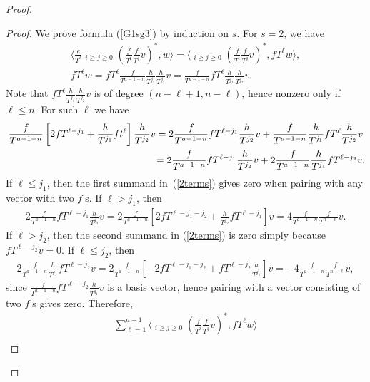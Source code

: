 \begin{proof}
\begin{proof}
We prove formula (\ref{G1sg3}) by induction on $s$. For $s=2$, we have
\begin{gather*}
\bigg\langle \frac{e}{T^{\ell}} \mathop{\sum_{i+j=a-1-\ell}}_{i\geq j\geq 0} \left(\frac{f}{T^i}\frac{f}{T^j}v\right)^*, w \bigg\rangle = \bigg\langle \mathop{\sum_{i+j=a-1-\ell}}_{i\geq j\geq 0} \left(\frac{f}{T^i}\frac{f}{T^j}v\right)^*, fT^{\ell} w \bigg\rangle, \\
 fT^{\ell} w = fT^{\ell} \frac{f}{T^{a-1-n}}\frac{h}{T^{j_1}} \frac{h}{T^{j_2}} v = \frac{f}{T^{a-1-n}} fT^{\ell} \frac{h}{T^{j_1}} \frac{h}{T^{j_2}} v.
\end{gather*}
Note that $fT^{\ell} \frac{h}{T^{j_1}} \frac{h}{T^{j_2}} v$ is of degree $(n-\ell+1, n-\ell)$, hence nonzero only if $\ell \leq n$. For such $\ell$ we have
\begin{gather}
\frac{f}{T^{a-1-n}} \left[ 2fT^{\ell-j_1} + \frac{h}{T^{j_1}} ft^{\ell} \right] \frac{h}{T^{j_2}} v = 2 \frac{f}{T^{a-1-n}} fT^{\ell-j_1} \frac{h}{T^{j_2}} v + \frac{f}{T^{a-1-n}} \frac{h}{T^{j_1}} fT^{\ell} \frac{h}{T^{j_2}} v \nonumber \\
\hphantom{\frac{f}{T^{a-1-n}} \left[ 2fT^{\ell-j_1} + \frac{h}{T^{j_1}} ft^{\ell} \right] \frac{h}{T^{j_2}} v} = 2 \frac{f}{T^{a-1-n}} fT^{\ell-j_1} \frac{h}{T^{j_2}} v +2 \frac{f}{T^{a-1-n}} \frac{h}{T^{j_1}} fT^{\ell-j_2} v. \label{2terms}
\end{gather}
If $\ell \leq j_1$, then the first summand in~(\ref{2terms}) gives zero when pairing with any vector with two $f$'s. If $\ell > j_1$, then
\begin{gather*}
2 \frac{f}{T^{a-1-n}} fT^{\ell-j_1} \frac{h}{T^{j_2}} v = 2 \frac{f}{T^{a-1-n}} \left[ 2fT^{\ell-j_1-j_2} + \frac{h}{T^{j_2}}fT^{\ell-j_1} \right] v = 4 \frac{f}{T^{a-1-n}} \frac{f}{T^{n-\ell}} v.
\end{gather*}
If $\ell > j_2$, then the second summand in (\ref{2terms}) is zero simply because $fT^{\ell-j_2} v = 0$. If $\ell \leq j_2$, then
\begin{gather*}
2 \frac{f}{T^{a-1-n}} \frac{h}{T^{j_1}} fT^{\ell-j_2} v = 2 \frac{f}{T^{a-1-n}} \left[ -2 fT^{\ell-j_1-j_2} + fT^{\ell-j_2}\frac{h}{T^{j_1}} \right] v = -4 \frac{f}{T^{a-1-n}} \frac{f}{T^{n-\ell}} v,
\end{gather*}
since $\frac{f}{T^{a-1-n}} fT^{\ell-j_2}\frac{h}{T^{j_1}}v$ is a basis vector, hence pairing with a vector consisting of two $f$'s gives zero. Therefore,
\begin{gather}
\sum_{\ell=1}^{a-1} \bigg\langle \mathop{\sum_{i+j=a-1-\ell}}_{i\geq j\geq 0} \left(\frac{f}{T^i}\frac{f}{T^j}v\right)^*, fT^{\ell} w \bigg\rangle \nonumber \\

\end{gather}
\end{proof}
\end{proof}
